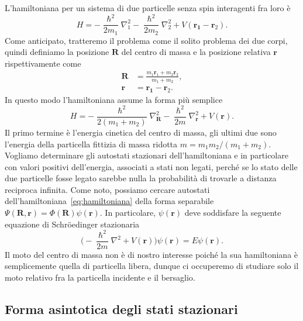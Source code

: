 \documentclass[a4paper,fleqn,twoside,12pt]{article}
\begin{document}
L'hamiltoniana per un sistema di due particelle senza spin interagenti fra loro
è
\begin{equation}
  H = -\frac{\hslash^{2}}{2m_{1}} \nabla_{1}^{2}
  -\frac{\hslash^{2}}{2m_{2}}\nabla_{2}^{2} + V(\bm{r_{1}} - \bm{r}_{2}).
\end{equation}
Come anticipato, tratteremo il problema come il solito problema dei due corpi,
quindi definiamo la posizione $\bm{R}$ del centro di massa e la posizione
relativa $\bm{r}$ rispettivamente come
\begin{subequations}
  \begin{align}
    \bm{R} &= \frac{m_{1}\bm{r}_{1} + m_{2}\bm{r}_{2}}{m_{1} + m_{2}}, \\
    \bm{r} &= \bm{r_{1}} - \bm{r}_{2}.
  \end{align}
\end{subequations}
In questo modo l'hamiltoniana assume la forma più semplice
\begin{equation}
  \label{eq:hamiltoniana}
  H = -\frac{\hslash^{2}}{2(m_{1} + m_{2})}\nabla_{\bm{R}}^{2} -
  \frac{\hslash^{2}}{2m}\nabla_{\bm{r}}^{2} + V(\bm{r}).
\end{equation}
Il primo termine è l'energia cinetica del centro di massa, gli ultimi due sono
l'energia della particella fittizia di massa ridotta
$m = m_{1}m_{2}/(m_{1}+m_{2})$.  Vogliamo determinare gli autostati stazionari
dell'hamiltoniana e in particolare con valori positivi dell'energia, associati a
stati non legati, perché se lo stato delle due particelle fosse legato sarebbe
nulla la probabilità di trovarle a distanza reciproca infinita.  Come noto,
possiamo cercare autostati dell'hamiltoniana~\eqref{eq:hamiltoniana} della forma
separabile $\Psi(\bm{R}, \bm{r}) = \Phi(\bm{R})\psi(\bm{r})$.  In particolare,
$\psi(\bm{r})$ deve soddisfare la seguente equazione di Schröedinger stazionaria
\begin{equation}
  \bigg(-\frac{\hslash^{2}}{2m}\nabla^{2} + V(\bm{r})\bigg)\psi(\bm{r}) =
  E\psi(\bm{r}).
\end{equation}
Il moto del centro di massa non è di nostro interesse poiché la sua hamiltoniana
è semplicemente quella di particella libera, dunque ci occuperemo di studiare
solo il moto relativo fra la particella incidente e il bersaglio.

\subsection{Forma asintotica degli stati stazionari}
\label{sec:forma-asintintotica}
\end{document}
